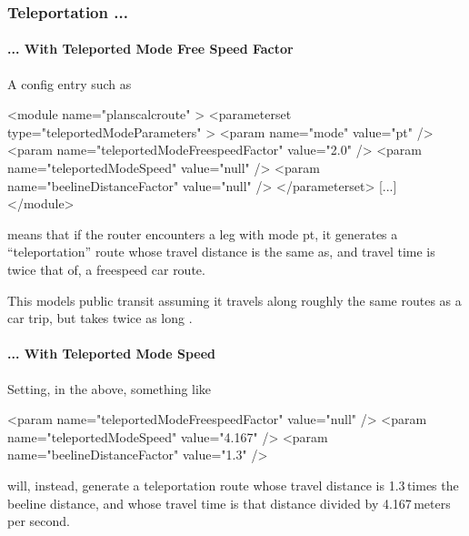 

\subsubsection{Teleportation ...}
\label{sec:teleportation-routing}

\paragraph{... With Teleported Mode Free Speed Factor}
A config entry such as
\begin{xml}
<module name="planscalcroute" >
   <parameterset type="teleportedModeParameters" >
      <param name="mode" value="pt" />
      <param name="teleportedModeFreespeedFactor" value="2.0" />
      <param name="teleportedModeSpeed" value="null" />
      <param name="beelineDistanceFactor" value="null" />
   </parameterset>
   [...]   
</module>      
\end{xml}
means that if the router encounters a leg with mode pt, it generates a ``teleportation'' route whose travel distance is the same as, and  travel time is twice that of, a freespeed car route.

This models public transit assuming it travels along roughly the same routes as a car trip, but takes twice as long \citep[\cf][]{Reinhold2006Konzeptzurintegrierten}.

\paragraph{... With Teleported Mode Speed}  Setting, in the above, something like
\begin{xml}
      <param name="teleportedModeFreespeedFactor" value="null" />
      <param name="teleportedModeSpeed" value="4.167" />
      <param name="beelineDistanceFactor" value="1.3" />
\end{xml}
will, instead, generate a teleportation route whose travel distance is 1.3\,times the beeline distance, and whose travel time is that distance divided by 4.167\,meters per second.

